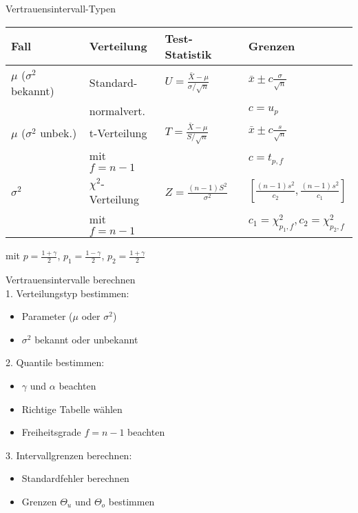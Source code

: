 \begin{concept}{Vertrauensintervall-Typen}\\
\begin{center}
\begin{tabular}{|l|l|l|l|}
\hline
Fall & Verteilung & Test-Statistik & Grenzen \\
\hline
$\mu$ ($\sigma^2$ bekannt) & Standard- & $U = \frac{\bar{X}-\mu}{\sigma/\sqrt{n}}$ & $\bar{x} \pm c\frac{\sigma}{\sqrt{n}}$ \\
& normalvert. & & $c = u_p$ \\
\hline
$\mu$ ($\sigma^2$ unbek.) & t-Verteilung & $T = \frac{\bar{X}-\mu}{S/\sqrt{n}}$ & $\bar{x} \pm c\frac{s}{\sqrt{n}}$ \\
& mit $f=n-1$ & & $c = t_{p,f}$ \\
\hline
$\sigma^2$ & $\chi^2$-Verteilung & $Z = \frac{(n-1)S^2}{\sigma^2}$ & $[\frac{(n-1)s^2}{c_2}, \frac{(n-1)s^2}{c_1}]$ \\
& mit $f=n-1$ & & $c_1 = \chi^2_{p_1,f}, c_2 = \chi^2_{p_2,f}$ \\
\hline
\end{tabular}
\end{center}

mit $p = \frac{1+\gamma}{2}$, $p_1 = \frac{1-\gamma}{2}$, $p_2 = \frac{1+\gamma}{2}$
\end{concept}

\begin{KR}{Vertrauensintervalle berechnen}\\
1. Verteilungstyp bestimmen:
   \begin{itemize}
     \item Parameter ($\mu$ oder $\sigma^2$)
     \item $\sigma^2$ bekannt oder unbekannt
   \end{itemize}

2. Quantile bestimmen:
   \begin{itemize}
     \item $\gamma$ und $\alpha$ beachten
     \item Richtige Tabelle wählen
     \item Freiheitsgrade $f=n-1$ beachten
   \end{itemize}

3. Intervallgrenzen berechnen:
   \begin{itemize}
     \item Standardfehler berechnen
     \item Grenzen $\Theta_u$ und $\Theta_o$ bestimmen
   \end{itemize}
\end{KR}

